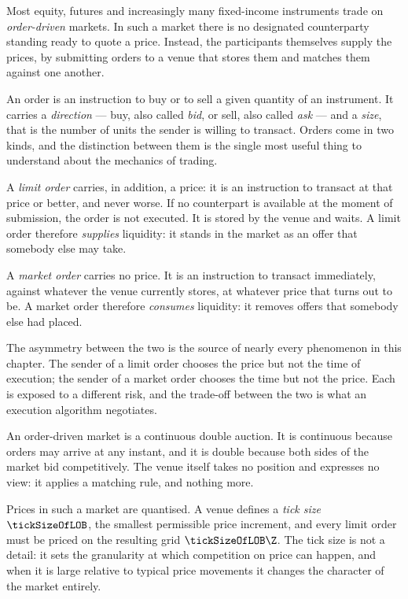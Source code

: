 Most equity, futures and increasingly many fixed-income instruments trade on
\emph{order-driven} markets.
In such a market there is no designated counterparty standing ready to quote a price.
Instead,
the participants themselves supply the prices,
by submitting orders to a venue that stores them and matches them against one another.

An order is an instruction to buy or to sell a given quantity of an instrument.
It carries a \emph{direction} ---
buy, also called \emph{bid}, or sell, also called \emph{ask} ---
and a \emph{size},
that is the number of units the sender is willing to transact.
Orders come in two kinds,
and the distinction between them is the single most useful thing to understand about
the mechanics of trading.

A \emph{limit order} carries, in addition, a price:
it is an instruction to transact at that price or better,
and never worse.
If no counterpart is available at the moment of submission,
the order is not executed.
It is stored by the venue and waits.
A limit order therefore \emph{supplies} liquidity:
it stands in the market as an offer that somebody else may take.

A \emph{market order} carries no price.
It is an instruction to transact immediately,
against whatever the venue currently stores,
at whatever price that turns out to be.
A market order therefore \emph{consumes} liquidity:
it removes offers that somebody else had placed.

The asymmetry between the two is the source of nearly every phenomenon in this chapter.
The sender of a limit order chooses the price but not the time of execution;
the sender of a market order chooses the time but not the price.
Each is exposed to a different risk,
and the trade-off between the two is what an execution algorithm negotiates.

\begin{remark}
\label{remark.tradingIsAnAuction}
An order-driven market is a continuous double auction.
It is continuous because orders may arrive at any instant,
and it is double because both sides of the market bid competitively.
The venue itself takes no position and expresses no view:
it applies a matching rule, and nothing more.
\end{remark}

Prices in such a market are quantised.
A venue defines a \emph{tick size} $\tickSizeOfLOB$,
the smallest permissible price increment,
and every limit order must be priced on the resulting grid $\tickSizeOfLOB \Z$.
The tick size is not a detail:
it sets the granularity at which competition on price can happen,
and when it is large relative to typical price movements it changes
the character of the market entirely.
